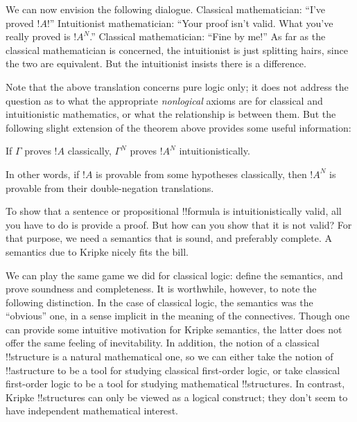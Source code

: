 \documentclass[../../../include/open-logic-section]{subfiles}
\begin{document}
We can now envision the following dialogue. Classical mathematician:
``I've proved $!A$!'' Intuitionist mathematician: ``Your proof isn't
valid. What you've really proved is $!A^N$.'' Classical mathematician:
``Fine by me!'' As far as the classical mathematician is concerned, the
intuitionist is just splitting hairs, since the two are
equivalent. But the intuitionist insists there is a difference.

Note that the above translation concerns pure logic only; it does not
address the question as to what the appropriate \emph{nonlogical}
axioms are for classical and intuitionistic mathematics, or what the
relationship is between them. But the following slight extension of
the theorem above provides some useful information:

\begin{thm}
If $\Gamma$ proves $!A$ classically, $\Gamma^N$ proves $!A^N$
intuitionistically.
\end{thm}

In other words, if $!A$ is provable from some hypotheses classically,
then $!A^N$ is provable from their double-negation translations.

To show that a sentence or propositional !!{formula} is intuitionistically
valid, all you have to do is provide a proof. But how can you show
that it is not valid? For that purpose, we need a semantics
that is sound, and preferably complete. A semantics
due to Kripke nicely fits the bill.

We can play the same game we did for classical logic: define the
semantics, and prove soundness and completeness. It is worthwhile,
however, to note the following distinction. In the case of classical
logic, the semantics was the ``obvious'' one, in a sense implicit in
the meaning of the connectives. Though one can provide some intuitive
motivation for Kripke semantics, the latter does not offer the same
feeling of inevitability. In addition, the notion of a classical
!!{structure} is a natural mathematical one, so we can either take the
notion of !!a{structure} to be a tool for studying classical first-order
logic, or take classical first-order logic to be a tool for studying
mathematical !!{structure}s. In contrast, Kripke !!{structure}s can only be
viewed as a logical construct; they don't seem to have independent
mathematical interest.
\end{document}

